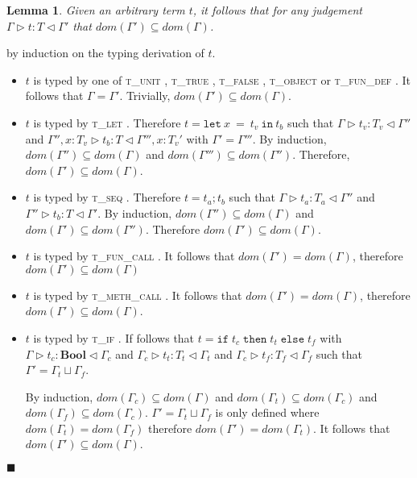 \documentclass[preprint]{sigplanconf}
\newtheorem{lem}{Lemma}
\newcommand{\tunit}{\textsc{t\_unit} }
\newcommand{\ttrue}{\textsc{t\_true} }
\newcommand{\tfalse}{\textsc{t\_false} }
\newcommand{\tobj}{\textsc{t\_object} }
\newcommand{\tfundef}{\textsc{t\_fun\_def} }
\newcommand{\tlet}{\textsc{t\_let} }
\newcommand{\tif}{\textsc{t\_if} }
\newcommand{\tseq}{\textsc{t\_seq} }
\newcommand{\tfunc}{\textsc{t\_fun\_call} }
\newcommand{\tmethc}{\textsc{t\_meth\_call} }
\newcommand{\typerule}[4]{#1 \triangleright #2 : #3 \triangleleft #4}
\newcommand{\boolt}{\mathbf{Bool}}
\newcommand{\lett}[3]{\mathtt{let}\:#1\:\mathtt{=}\:#2\:\mathtt{in}\:#3}
\newcommand{\ift}[3]{\mathtt{if} \; #1 \; \mathtt{then} \; #2 \; \mathtt{else} \; #3}
\newcommand{\qed}{$\blacksquare$}
\newenvironment{proof}{\vspace{1ex}\noindent{\bf Proof}\hspace{0.5em}}
  {\hfill\qed\vspace{1ex}}
\begin{document}

\begin{lem}
\label{lem:ctxsubset}
Given an arbitrary term $t$, it follows that for any judgement
$\typerule{\Gamma}{t}{T}{\Gamma'}$ that $dom(\Gamma') \subseteq dom(\Gamma)$.
\end{lem}
\begin{proof}
by induction on the typing derivation of $t$.

\begin{itemize}
\item $t$ is typed by one of \tunit, \ttrue, \tfalse,
\tobj or \tfundef. It follows that $\Gamma = \Gamma'$. Trivially,
$dom(\Gamma') \subseteq dom(\Gamma)$.

\item $t$ is typed by \tlet. Therefore $t = \lett{x}{t_v}{t_b}$
such that $\typerule{\Gamma}{t_v}{T_v}{\Gamma''}$ and
$\typerule{\Gamma'', x : T_v}{t_b}{T}{\Gamma''', x : T_v'}$
with $\Gamma' = \Gamma'''$.
By induction, $dom(\Gamma'') \subseteq dom(\Gamma)$ and $dom(\Gamma''') \subseteq dom(\Gamma'')$.
Therefore, $dom(\Gamma') \subseteq dom(\Gamma)$.

\item $t$ is typed by \tseq. Therefore $t = t_a ; t_b$ such that
$\typerule{\Gamma}{t_a}{T_a}{\Gamma''}$ and
$\typerule{\Gamma''}{t_b}{T}{\Gamma'}$. By induction,
$dom(\Gamma'') \subseteq dom(\Gamma)$ and $dom(\Gamma') \subseteq dom(\Gamma'')$. Therefore
$dom(\Gamma') \subseteq dom(\Gamma)$.

\item $t$ is typed by \tfunc. It follows that $dom(\Gamma') = dom(\Gamma)$,
therefore $dom(\Gamma') \subseteq dom(\Gamma)$

\item $t$ is typed by \tmethc. It follows that $dom(\Gamma') = dom(\Gamma)$,
therefore $dom(\Gamma') \subseteq dom(\Gamma)$.

\item $t$ is typed by \tif. If follows that $t = \ift{t_c}{t_t}{t_f}$
with $\typerule{\Gamma}{t_c}{\boolt}{\Gamma_c}$
and $\typerule{\Gamma_c}{t_t}{T_t}{\Gamma_t}$
and $\typerule{\Gamma_c}{t_f}{T_f}{\Gamma_f}$ such that
$\Gamma' = \Gamma_t \sqcup \Gamma_f$.

By induction, $dom(\Gamma_c) \subseteq dom(\Gamma)$ and
$dom(\Gamma_t) \subseteq dom(\Gamma_c)$ and
$dom(\Gamma_f) \subseteq dom(\Gamma_c)$. $\Gamma' = \Gamma_t \sqcup \Gamma_f$
is only defined where $dom(\Gamma_t) = dom(\Gamma_f)$ therefore
$dom(\Gamma') = dom(\Gamma_t)$. It follows that
$dom(\Gamma') \subseteq dom(\Gamma)$.


\end{itemize}
\end{proof}
\end{document}
